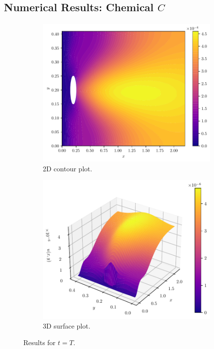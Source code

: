\documentclass{beamer}
\theoremstyle{definition}
\theoremstyle{remark}
\theoremstyle{example}
\newif\ifinsection
\newif\ifinsubsection
\let\oldsubsection\subsection
\renewcommand{\subsection}{
  \global\insubsectiontrue
  \oldsubsection}
\newcommand {\aframe}[1] {
  \begin{frame}
    \ifinsection\frametitle{\secname}\fi
    \ifinsubsection\framesubtitle{\subsecname}\fi
  #1
  \end{frame}
}
\begin{document}
\subsection{Numerical Results: Chemical $C$}
\aframe{
\begin{figure}
  \begin{subfigure}[b]{0.45\textwidth}
    \centering
    \includegraphics[width=\textwidth]{figs/c-chemical-2d.pdf}
    \caption{2D contour plot.}
  \end{subfigure}
  \begin{subfigure}[b]{0.53\textwidth}
    \centering
    \includegraphics[width=\textwidth]{figs/c-chemical-3d.pdf}
    \caption{3D surface plot.}
  \end{subfigure}
  \caption{Results for $t=T$.}
\end{figure}
}
\end{document}
